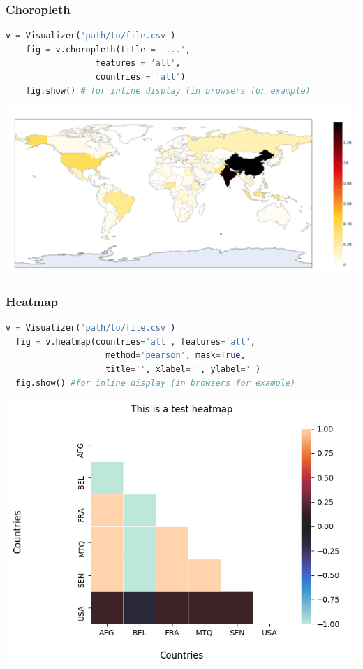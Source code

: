 \begin{frame}[fragile,shrink=30]
   \frametitle{Choropleth}
   \begin{lstlisting}[language=Python]
    v = Visualizer('path/to/file.csv')
    fig = v.choropleth(title = '...',
                  features = 'all',
                  countries = 'all')
    fig.show() # for inline display (in browsers for example)
    \end{lstlisting}
    \begin{center}
        \includegraphics[scale=0.4]{beamer/inc/graphics/choropleth.png} 
    \end{center}
\end{frame}

\begin{frame}[fragile,shrink=30]
  \frametitle{Heatmap}
  \begin{lstlisting}[language=Python]
  v = Visualizer('path/to/file.csv')
  fig = v.heatmap(countries='all', features='all',
                    method='pearson', mask=True,
                    title='', xlabel='', ylabel='')
  fig.show() #for inline display (in browsers for example)
  \end{lstlisting}
  \begin{center}
    \includegraphics[scale=0.6]{beamer/inc/graphics/heatmap.png}
    \end{center}
\end{frame}

